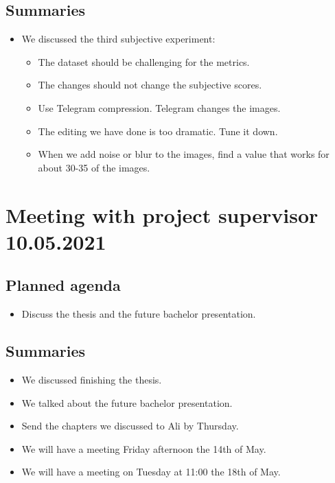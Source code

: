 \subsection*{Summaries}
\begin{itemize}
    \item We discussed the third subjective experiment:
    \begin{itemize}
        \item The dataset should be challenging for the metrics.
        \item The changes should not change the subjective scores.
        \item Use Telegram compression. Telegram changes the images.
        \item The editing we have done is too dramatic. Tune it down.
        \item When we add noise or blur to the images, find a value that works for about 30-35 of the images.
    \end{itemize}
\end{itemize}


\section*{Meeting with project supervisor 10.05.2021}
\subsection*{Planned agenda}
\begin{itemize}
    \item Discuss the thesis and the future bachelor presentation.
\end{itemize}

\subsection*{Summaries}
\begin{itemize}
    \item We discussed finishing the thesis.
    \item We talked about the future bachelor presentation.
    \item Send the chapters we discussed to Ali by Thursday.
    \item We will have a meeting Friday afternoon the 14th of May.
    \item We will have a meeting on Tuesday at 11:00 the 18th of May.
\end{itemize}


